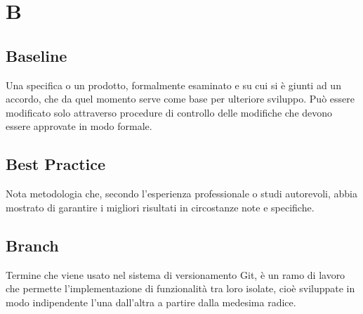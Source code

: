 \section*{B}

\subsection{Baseline}
Una specifica o un prodotto, formalmente esaminato e su cui si è giunti ad un accordo, che da quel momento serve come base per ulteriore sviluppo. Può essere modificato solo attraverso procedure di controllo delle modifiche che devono essere approvate in modo formale.

\subsection{Best Practice}
Nota metodologia che, secondo l'esperienza professionale o studi autorevoli, abbia mostrato di garantire i migliori risultati in circostanze note e specifiche.

\subsection{Branch}
Termine che viene usato nel sistema di versionamento Git, è un ramo di lavoro che permette l'implementazione di funzionalità tra loro isolate, cioè sviluppate in modo indipendente l'una dall'altra a partire dalla medesima radice.